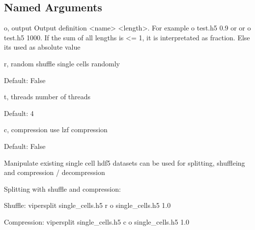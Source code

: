 \documentclass[letterpaper,10pt,english]{sphinxmanual}
\begin{document}
\subsection{Named Arguments}
\label{\detokenize{pages/vipercmd:Named Arguments}}\begin{optionlist}{3cm}
\item [\sphinxhyphen{}o, \sphinxhyphen{}\sphinxhyphen{}output]  
\sphinxAtStartPar
Output definition \textless{}name\textgreater{} \textless{}length\textgreater{}. For example \sphinxhyphen{}o test.h5 0.9 or or \sphinxhyphen{}o test.h5 1000. If the sum of all lengths is \textless{}= 1, it is interpretated as fraction. Else its used as absolute value
\item [\sphinxhyphen{}r, \sphinxhyphen{}\sphinxhyphen{}random]  
\sphinxAtStartPar
shuffle single cells randomly

\sphinxAtStartPar
Default: False
\item [\sphinxhyphen{}t, \sphinxhyphen{}\sphinxhyphen{}threads]  
\sphinxAtStartPar
number of threads

\sphinxAtStartPar
Default: 4
\item [\sphinxhyphen{}c, \sphinxhyphen{}\sphinxhyphen{}compression]  
\sphinxAtStartPar
use lzf compression

\sphinxAtStartPar
Default: False
\end{optionlist}

\sphinxAtStartPar
Manipulate existing single cell hdf5 datasets
can be used for splitting, shuffleing and compression / decompression

\sphinxAtStartPar
Splitting with shuffle and compression:

\begin{sphinxVerbatim}[commandchars=\\\{\}]
            
\end{sphinxVerbatim}

\sphinxAtStartPar
Shuffle:
viper\sphinxhyphen{}split single\_cells.h5 \sphinxhyphen{}r \sphinxhyphen{}o single\_cells.h5 1.0

\sphinxAtStartPar
Compression:
viper\sphinxhyphen{}split single\_cells.h5 \sphinxhyphen{}c \sphinxhyphen{}o single\_cells.h5 1.0
\end{document}
